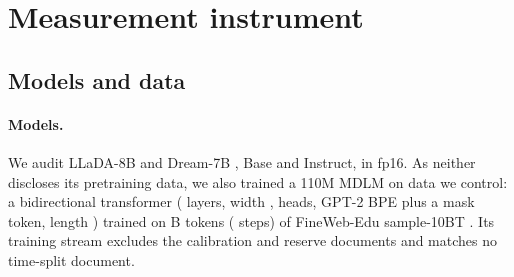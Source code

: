 %
%

\section{Measurement instrument}
\label{sec:instrument}

\subsection{Models and data}
\label{sec:models}

\paragraph{Models.}
We audit LLaDA-8B \citep{nie2025llada} and Dream-7B \citep{ye2025dream}, Base and Instruct, in
fp16. As neither discloses its pretraining data, we also trained a 110M MDLM
\citep{sahoo2024mdlm} on data we control: a bidirectional transformer
(\VivaMdlmLayers{} layers, width \VivaMdlmWidth{}, \VivaMdlmHeads{} heads, GPT-2 BPE plus a
mask token, length \VivaMdlmSeqLen{}) trained on \VivaMdlmTokensB{}B tokens
(\VivaMdlmSteps{} steps) of FineWeb-Edu sample-10BT \citep{penedo2024fineweb}. Its training
stream excludes the calibration and reserve documents and matches no time-split document.

